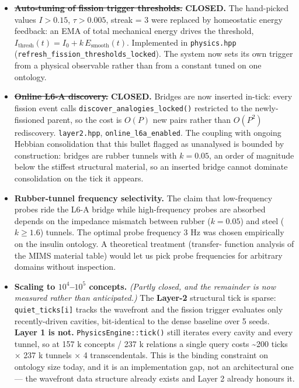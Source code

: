 \documentclass[
  11pt,
  a4paper,
]{article}
\begin{document}
\begin{itemize}
\item
  \st{\textbf{Auto-tuning of fission trigger thresholds.}}
  \textbf{CLOSED.} The hand-picked values \(I > 0.15\),
  \(\tau > 0.005\), streak = 3 were replaced by homeostatic energy
  feedback: an EMA of total mechanical energy drives the threshold,
  \(I_{\text{thresh}}(t) = I_0 + k\,
  E_{\text{smooth}}(t)\). Implemented in \texttt{physics.hpp}
  (\texttt{refresh\_fission\_thresholds\_locked}). The system now sets
  its own trigger from a physical observable rather than from a constant
  tuned on one ontology.
\item
  \st{\textbf{Online L6-A discovery.}} \textbf{CLOSED.} Bridges are now
  inserted in-tick: every fission event calls
  \texttt{discover\_analogies\_locked()} restricted to the
  newly-fissioned parent, so the cost is \(O(P)\) new pairs rather than
  \(O(P^2)\) rediscovery. \texttt{layer2.hpp},
  \texttt{online\_l6a\_enabled}. The coupling with ongoing Hebbian
  consolidation that this bullet flagged as unanalysed is bounded by
  construction: bridges are rubber tunnels with \(k = 0.05\), an order
  of magnitude below the stiffest structural material, so an inserted
  bridge cannot dominate consolidation on the tick it appears.
\item
  \textbf{Rubber-tunnel frequency selectivity.} The claim that
  low-frequency probes ride the L6-A bridge while high-frequency probes
  are absorbed depends on the impedance mismatch between rubber
  (\(k=0.05\)) and steel (\(k \geq 1.6\)) tunnels. The optimal probe
  frequency 3 Hz was chosen empirically on the insulin ontology. A
  theoretical treatment (transfer- function analysis of the MIMS
  material table) would let us pick probe frequencies for arbitrary
  domains without inspection.
\item
  \textbf{Scaling to \(10^4\)--\(10^5\) concepts.} \emph{(Partly closed,
  and the remainder is now measured rather than anticipated.)} The
  \textbf{Layer-2} structural tick is sparse:
  \texttt{quiet\_ticks{[}i{]}} tracks the wavefront and the fission
  trigger evaluates only recently-driven cavities, bit-identical to the
  dense baseline over 5 seeds. \textbf{Layer 1 is not.}
  \texttt{PhysicsEngine::tick()} still iterates every cavity and every
  tunnel, so at 157 k concepts / 237 k relations a single query costs
  \textasciitilde200 ticks × 237 k tunnels × 4 transcendentals. This is
  the binding constraint on ontology size today, and it is an
  implementation gap, not an architectural one --- the wavefront data
  structure already exists and Layer 2 already honours it.


\end{itemize}
\end{document}
